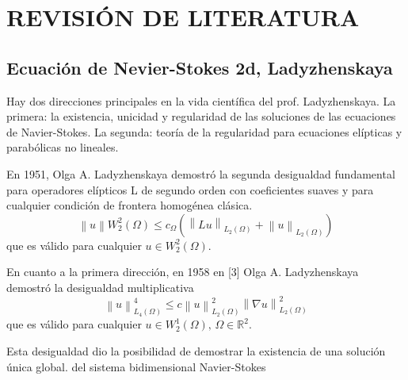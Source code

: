 

\chapter{REVISIÓN DE LITERATURA}

\section{Ecuación de Nevier-Stokes 2d, Ladyzhenskaya}
Hay dos direcciones principales en la vida científica del prof. Ladyzhenskaya. La primera: la existencia, unicidad y regularidad de las soluciones de las ecuaciones de Navier-Stokes. La segunda: teoría de la regularidad para ecuaciones elípticas y parabólicas no lineales.

En 1951, Olga A. Ladyzhenskaya demostró la segunda desigualdad fundamental para operadores elípticos L de segundo orden con coeficientes suaves y para cualquier condición de frontera homogénea clásica.
\begin{equation}
    \left\lVert u \right\rVert W_2^2 (\Omega)\leq c_{\Omega} \left( \left\lVert Lu\right\rVert_{L_2(\Omega)} +\left\lVert u\right\rVert_{L_2(\Omega)} \right)
\end{equation}
que es válido para cualquier $u\in W_2^2(\Omega)$.

En cuanto a la primera dirección, en 1958 en [3] Olga A. Ladyzhenskaya demostró la desigualdad multiplicativa
\begin{equation}
    \left\lVert u \right\rVert_{L_4(\Omega)}^4\leq c \left\lVert u\right\rVert_{L_2(\Omega)}^2\left\lVert \nabla u\right\rVert_{L_2(\Omega)}^2  
\end{equation}
que es válido para cualquier $u\in W_2^1(\Omega),\, \Omega\in \mathbb{R}^2$.

Esta desigualdad dio la posibilidad de demostrar la existencia de una solución única global. del sistema bidimensional Navier-Stokes